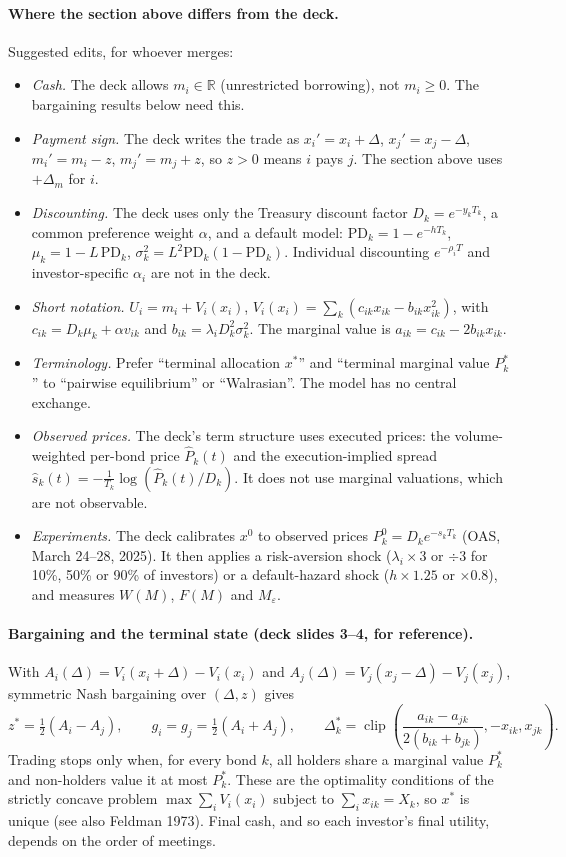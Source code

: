 \paragraph{Where the section above differs from the deck.}
Suggested edits, for whoever merges:
\begin{itemize}
\item \emph{Cash.} The deck allows $m_i\in\mathbb{R}$ (unrestricted borrowing), not $m_i\ge 0$. The bargaining results below need this.
\item \emph{Payment sign.} The deck writes the trade as $x_i'=x_i+\Delta$, $x_j'=x_j-\Delta$, $m_i'=m_i-z$, $m_j'=m_j+z$, so $z>0$ means $i$ pays $j$. The section above uses $+\Delta_m$ for $i$.
\item \emph{Discounting.} The deck uses only the Treasury discount factor $D_k=e^{-y_kT_k}$, a common preference weight $\alpha$, and a default model: $\mathrm{PD}_k=1-e^{-hT_k}$, $\mu_k=1-L\,\mathrm{PD}_k$, $\sigma_k^2=L^2\mathrm{PD}_k(1-\mathrm{PD}_k)$. Individual discounting $e^{-\rho_iT}$ and investor-specific $\alpha_i$ are not in the deck.
\item \emph{Short notation.} $U_i=m_i+V_i(x_i)$, $V_i(x_i)=\sum_k(c_{ik}x_{ik}-b_{ik}x_{ik}^2)$, with $c_{ik}=D_k\mu_k+\alpha v_{ik}$ and $b_{ik}=\lambda_iD_k^2\sigma_k^2$. The marginal value is $a_{ik}=c_{ik}-2b_{ik}x_{ik}$.
\item \emph{Terminology.} Prefer ``terminal allocation $x^*$'' and ``terminal marginal value $P^*_k$'' to ``pairwise equilibrium'' or ``Walrasian''. The model has no central exchange.
\item \emph{Observed prices.} The deck's term structure uses executed prices: the volume-weighted per-bond price $\hat P_k(t)$ and the execution-implied spread $\hat s_k(t)=-\frac1{T_k}\log(\hat P_k(t)/D_k)$. It does not use marginal valuations, which are not observable.
\item \emph{Experiments.} The deck calibrates $x^0$ to observed prices $P^0_k=D_ke^{-s_kT_k}$ (OAS, March 24--28, 2025). It then applies a risk-aversion shock ($\lambda_i\times3$ or $\div3$ for 10\%, 50\% or 90\% of investors) or a default-hazard shock ($h\times1.25$ or $\times0.8$), and measures $W(M)$, $F(M)$ and $M_\varepsilon$.
\end{itemize}

\paragraph{Bargaining and the terminal state (deck slides 3--4, for reference).}
With $A_i(\Delta)=V_i(x_i+\Delta)-V_i(x_i)$ and $A_j(\Delta)=V_j(x_j-\Delta)-V_j(x_j)$, symmetric Nash bargaining over $(\Delta,z)$ gives
\[
z^*=\tfrac12(A_i-A_j),\qquad g_i=g_j=\tfrac12(A_i+A_j),\qquad
\Delta_k^*=\operatorname{clip}\!\left(\frac{a_{ik}-a_{jk}}{2(b_{ik}+b_{jk})},-x_{ik},x_{jk}\right).
\]
Trading stops only when, for every bond $k$, all holders share a marginal value $P_k^*$ and non-holders value it at most $P_k^*$. These are the optimality conditions of the strictly concave problem $\max\sum_iV_i(x_i)$ subject to $\sum_ix_{ik}=X_k$, so $x^*$ is unique (see also Feldman 1973). Final cash, and so each investor's final utility, depends on the order of meetings.

